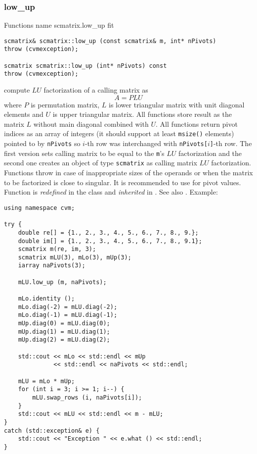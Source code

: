 \subsubsection{low\_up}
Functions%
\pdfdest name {scmatrix.low_up} fit
\begin{verbatim}
scmatrix& scmatrix::low_up (const scmatrix& m, int* nPivots)
throw (cvmexception);

scmatrix scmatrix::low_up (int* nPivots) const
throw (cvmexception);
\end{verbatim}
compute $LU$ factorization of a calling matrix as
\begin{equation*}
A=PLU
\end{equation*}
where $P$ is  permutation matrix, $L$ is  lower
triangular matrix with unit diagonal
elements and $U$ is  upper triangular matrix.
All functions store result as the matrix $L$ without
main diagonal combined with $U$. All functions
return pivot indices as an array of integers
(it should support at least \verb"msize()" elements)
pointed to by \verb"nPivots" so \hbox{$i$-th} row
was interchanged with \hbox{\verb"nPivots["$i$\verb"]"-th} row.
The first version sets  calling matrix to be equal to the
\verb"m"'s $LU$ factorization and the second one
creates an object of type \verb"scmatrix" as  calling matrix
$LU$ factorization.
Functions throw 
in case of inappropriate
sizes of the operands or when the matrix to be factorized is close to
singular. It is recommended to use 
for pivot values.
Function is \emph{redefined} in the class
and \emph{inherited} in .
See also
.
Example:
\begin{Verbatim}
using namespace cvm;

try {
    double re[] = {1., 2., 3., 4., 5., 6., 7., 8., 9.};
    double im[] = {1., 2., 3., 4., 5., 6., 7., 8., 9.1};
    scmatrix m(re, im, 3);
    scmatrix mLU(3), mLo(3), mUp(3);
    iarray naPivots(3);

    mLU.low_up (m, naPivots);

    mLo.identity ();
    mLo.diag(-2) = mLU.diag(-2);
    mLo.diag(-1) = mLU.diag(-1);
    mUp.diag(0) = mLU.diag(0);
    mUp.diag(1) = mLU.diag(1);
    mUp.diag(2) = mLU.diag(2);

    std::cout << mLo << std::endl << mUp 
              << std::endl << naPivots << std::endl;

    mLU = mLo * mUp;
    for (int i = 3; i >= 1; i--) {
        mLU.swap_rows (i, naPivots[i]);
    }
    std::cout << mLU << std::endl << m - mLU;
}
catch (std::exception& e) {
    std::cout << "Exception " << e.what () << std::endl;
}
\end{Verbatim}
